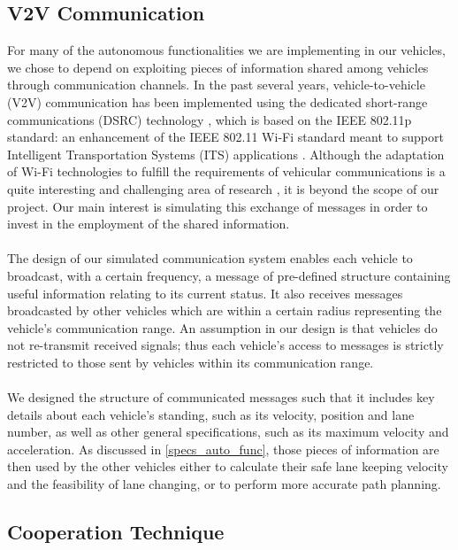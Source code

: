 \subsection{V2V Communication}
\label{specs_v2v_comm}
For many of the autonomous functionalities we are implementing in our vehicles, we chose to depend on exploiting pieces of information shared among vehicles through communication channels. In the past several years, vehicle-to-vehicle (V2V) communication has been implemented using the dedicated short-range communications (DSRC) technology \cite{6550885}\cite{5888501}, which is based on the IEEE 802.11p standard: an enhancement of the IEEE 802.11 Wi-Fi standard meant to support Intelligent Transportation Systems (ITS) applications \cite{5888501}. Although the adaptation of Wi-Fi technologies to fulfill the requirements of vehicular communications is a quite interesting and challenging area of research \cite{6550885}\cite{7374412}, it is beyond the scope of our project. Our main interest is simulating this exchange of messages in order to invest in the employment of the shared information.
\\ \\
The design of our simulated communication system enables each vehicle to broadcast, with a certain frequency, a message of pre-defined structure containing useful information relating to its current status. It also receives messages broadcasted by other vehicles which are within a certain radius representing the vehicle’s communication range. An assumption in our design is that vehicles do not re-transmit received signals; thus each vehicle’s access to messages is strictly  restricted to those sent by vehicles within its communication range.
\\ \\
We designed the structure of communicated messages such that it includes key details about each vehicle’s standing, such as its velocity, position and lane number, as well as other general specifications, such as its maximum velocity and acceleration. As discussed in \ref{specs_auto_func}, those pieces of information are then used by the other vehicles either to calculate their safe lane keeping velocity and the feasibility of lane changing, or to perform more accurate path planning.


\subsection{Cooperation Technique}
\label{specs_collab_tech}

